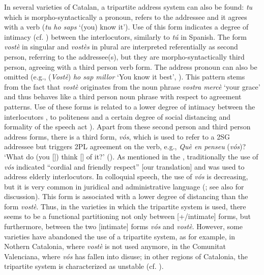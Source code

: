 \documentclass[output=paper]{langscibook}
\begin{document}
In several varieties of Catalan, a tripartite address system can also be found: \textit{tu}  which is morpho-syntactically a  pronoun, refers to the addressee and it agrees with a  verb (\textit{tu ho saps}  ‘(you) know it’). Use of this form indicates a degree of intimacy (cf. \citealt{Robinson1980}) between the interlocutors, similarly to \textit{tú} in Spanish. The form \textit{vostè}  in singular and \textit{vostès} in plural are interpreted referentially as second person, referring to the addressee(s), but they are morpho-syntactically third person, agreeing with a third person verb form. The address pronoun can also be omitted (e.g., (\textit{Vostè}) \textit{ho sap millor}  ‘You know it best’, \citealt[8.2.2]{GIEC2022}). This pattern stems from the fact that \textit{vostè}  originates from the noun phrase \textit{vostra mercè}  ‘your grace’ and thus behaves like a third person noun phrase with respect to agreement patterns. Use of these forms is related to a lower degree of intimacy between the interlocutors \citep{Robinson1980}, to politeness and a certain degree of social distancing and formality of the speech act \citep[8.2.2]{GIEC2022}). Apart from these second person and third person address forms, there is a third form, \textit{vós}, which is used to refer to a 2SG addressee but triggers 2PL agreement on the verb, e.g., \textit{Què en penseu} (\textit{vós})? ‘What do (you []) think [] of it?’ (\citealt[8.2.2]{GIEC2022}). As mentioned in the \citet[8.2.2]{GIEC2022}, traditionally the use of \textit{vós} indicated “cordial and friendly respect” [our translation] and was used to address elderly interlocutors. In colloquial speech, the use of \textit{vós}  is decreasing, but it is very common in juridical and administrative language (\citealt[8.2.2]{GIEC2022}; see also \citealt{Nogué2022} for discussion). This form is associated with a lower degree of distancing than the form \textit{vostè}. Thus, in the varieties in which the tripartite system is used, there seems to be a functional partitioning not only between [+/\textminus{}intimate] forms, but furthermore, between the two [\textminus{}intimate] forms \textit{vós}  and \textit{vostè}. However, some varieties have abandoned the use of a tripartite system, as for example, in Nothern Catalonia, where \textit{vostè}  is not used anymore, in the Comunitat Valenciana, where \textit{vós} has fallen into disuse; in other regions of Catalonia, the tripartite system is characterized as unstable (cf. \citealt{Robinson1980, Nogué2022}).
\end{document}
